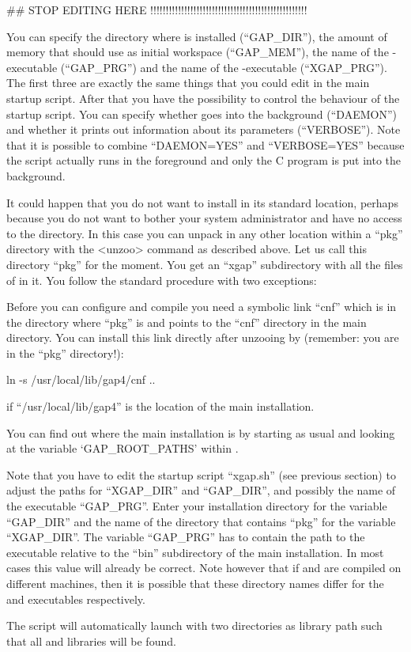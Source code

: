 \begintt
##  STOP EDITING HERE !!!!!!!!!!!!!!!!!!!!!!!!!!!!!!!!!!!!!!!!!!!!!!!!!!!
\endtt

You can specify the directory where {\GAP} is installed (``GAP\_DIR''), 
the amount of memory that {\GAP} should use as initial workspace
(``GAP\_MEM''), the name of the {\GAP}-executable (``GAP\_PRG'') and the
name of the {\XGAP}-executable (``XGAP\_PRG''). The first three are exactly 
the same things that you could edit in the main {\GAP} startup script.
After that you have the possibility to control the behaviour of the {\XGAP}
startup script. You can specify whether {\XGAP} goes into the background
(``DAEMON'') and whether it prints out information about its parameters
(``VERBOSE''). Note that it is possible to combine ``DAEMON=YES''
and ``VERBOSE=YES'' because the script actually runs in the foreground and
only the C program is put into the background.



It could happen that you do not want to install {\XGAP} in its
standard location, perhaps because you do not want to bother your
system administrator and have no access to the {\GAP} directory. In
this case you can unpack {\XGAP} in any other location within a
``pkg'' directory with the <unzoo> command as described above. Let us
call this directory ``pkg'' for the moment. You get an ``xgap''
subdirectory with all the files of {\XGAP} in it. You follow the
standard procedure with two exceptions:

Before you can configure and compile {\XGAP} you need a symbolic link
``cnf'' which is in the directory where ``pkg'' is and points to the ``cnf''
directory in the main {\GAP} directory. You can install this link directly
after unzooing by (remember: you are in the ``pkg'' directory!):

\begintt
ln -s /usr/local/lib/gap4/cnf ..
\endtt

if ``/usr/local/lib/gap4'' is the location of the main {\GAP} installation.

You can find out where the main {} installation is by starting 
{\GAP} as usual and looking at the variable `GAP_ROOT_PATHS' 
within {\GAP}.

Note that you have to edit the startup script ``xgap.sh'' (see previous 
section) to
adjust the paths for ``XGAP_DIR'' and ``GAP_DIR'', and possibly the
name of the {\GAP} executable ``GAP_PRG''.  Enter your {\GAP}
installation directory for the variable ``GAP_DIR'' and the name of
the directory that contains ``pkg'' for the variable ``XGAP_DIR''. The 
variable ``GAP_PRG'' has to contain the path to the {\GAP} executable relative
to the ``bin'' subdirectory of the main {\GAP} installation. In most cases
this value will already be correct. Note however that if {\GAP} and {\XGAP} 
are compiled on different machines, then it is possible that these directory
names differ for the {\GAP} and {\XGAP} executables respectively. 

The script will automatically launch {\GAP} with two directories as
library path such that all {\GAP} and {\XGAP} libraries will be found.

